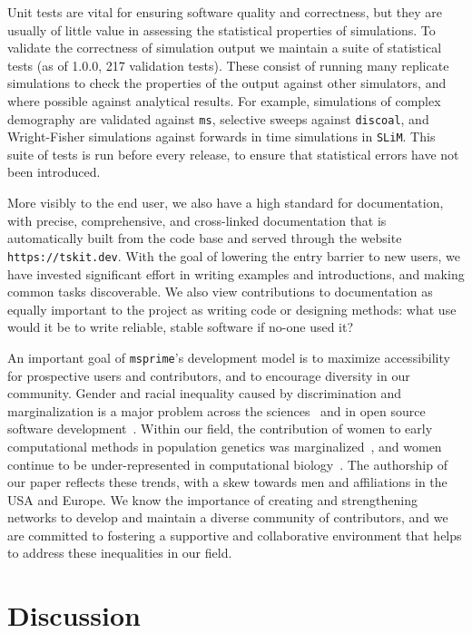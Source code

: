 \documentclass[9pt,twocolumn,twoside,lineno]{gsajnl}
\newcommand{\msprime}[0]{\texttt{msprime}}
\newcommand{\ms}[0]{\texttt{ms}}
\newcommand{\SLiM}[0]{\texttt{SLiM}}
\newcommand{\discoal}[0]{\texttt{discoal}}
\begin{document}
Unit tests are vital for ensuring software quality and correctness, but
they are usually of little value in assessing the statistical properties
of simulations. To validate the correctness of simulation output
we maintain a suite of statistical tests (as of 1.0.0,
217 validation tests). These consist of running many
replicate simulations to check the properties of the output
against other simulators, and where possible against analytical results.
For example, simulations of complex demography are validated against \ms,
selective sweeps against \discoal, and Wright-Fisher simulations
against forwards in time simulations in \SLiM.
This suite of tests is run before every release, to ensure
that statistical errors have not been introduced.

More visibly to the end user, we also have a high standard for documentation,
with precise, comprehensive, and cross-linked documentation
that is automatically built from the code base
and served through the website \texttt{https://tskit.dev}.
With the goal of lowering the entry barrier to new users,
we have invested significant effort in writing examples and introductions,
and making common tasks discoverable.
We also view contributions to documentation as equally important to the project
as writing code or designing methods: what use would it be
to write reliable, stable software if no-one used it?

An important goal of \msprime's development model is to maximize
accessibility for prospective users and contributors, and
to encourage diversity in our community.
Gender and racial inequality caused by discrimination and marginalization
is a major problem across
the sciences~\citep{wellenreuther2016women,shannon2019gender}
and in open source software development~\citep{trinkenreich2021women}.
Within our field, the contribution of women to early computational methods
in population genetics was marginalized~\citep{dung2019illuminating},
and women continue to be under-represented
in computational biology~\citep{bonham2017women}.
The authorship of our paper reflects these trends,
with a skew towards men and affiliations in the USA
and Europe. We know the importance of creating and strengthening networks to
develop and maintain a diverse community of contributors, and we are committed
to fostering a supportive and collaborative environment that helps to address these
inequalities in our field.

\section*{Discussion}
\end{document}
